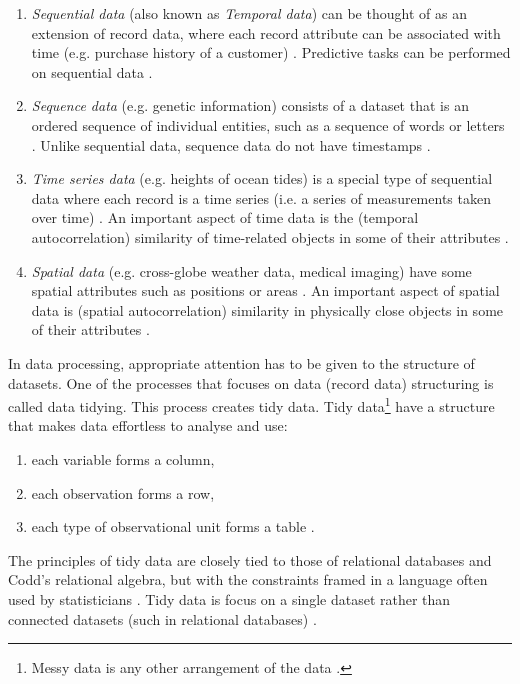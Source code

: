 \begin{enumerate}
\begin{enumerate}
    					\item \textit{Sequential data} (also known as \textit{Temporal data}) can be thought of as an extension of record data, where each record attribute can be associated with time (e.g. purchase history of a customer) \cite{Tan2013}. Predictive tasks can be performed on sequential data \cite{Tan2013}.
    					\item \textit{Sequence data} (e.g. genetic information) consists of a dataset that is an ordered sequence of individual entities, such as a sequence of words or letters \cite{Tan2013}. Unlike sequential data, sequence data do not have timestamps \cite{Tan2013}.
    					\item \textit{Time series data} (e.g. heights of ocean tides) is a special type of sequential data where each record is a time series (i.e. a series of measurements taken over time) \cite{Tan2013}. An important aspect of time data is the (temporal autocorrelation) similarity of time-related objects in some of their attributes \cite{Tan2013}.
    					\item \textit{Spatial data} (e.g. cross-globe weather data, medical imaging) have some spatial attributes such as positions or areas \cite{Tan2013}. An important aspect of spatial data is (spatial autocorrelation) similarity in physically close objects in some of their attributes \cite{Tan2013}.
    				\end{enumerate}
				\end{enumerate} 
				
				In data processing, appropriate attention has to be given to the structure of datasets. One of the processes that focuses on data (record data) structuring is called data tidying. This process creates tidy data. Tidy data\footnote{Messy data is any other arrangement of the data \cite{Wickham2014}.} have a structure that makes data effortless to analyse and use:
								 			
				\begin{enumerate}
					\item each variable forms a column,
					\item each observation forms a row,
					\item each type of observational unit forms a table \cite{Wickham2014}.
				\end{enumerate}				
				
				The principles of tidy data are closely tied to those of relational databases and Codd's relational algebra, but with the constraints framed in a language often used by statisticians \cite{Wickham2014}. Tidy data is focus on a single dataset rather than connected datasets (such in relational databases) \cite{Wickham2014}.
													
